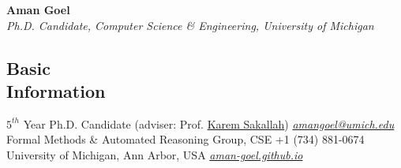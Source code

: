 \documentclass[line,margin,letter]{resume}
\begin{document}
\thispagestyle{empty}
{\sc \LARGE \phantom{xx}\hspace{25ex} \textbf{Aman Goel} 
\vspace{0.3cm}
\\
\large \emph{\phantom{xx}\hspace{11ex} Ph.D. Candidate, Computer Science \& Engineering, University of Michigan}}
\begin{resume}
    

\section{\mysidestyle Basic\\Information}
    $5^{th}$ Year Ph.D. Candidate (adviser: Prof. \href{http://web.eecs.umich.edu/~karem/}{Karem Sakallah})                       \hfill \href{mailto:amangoel@umich.edu}{\textit{amangoel@umich.edu}} \phantom{xx}\hspace{1ex} \faEnvelope \\
    Formal Methods \& Automated Reasoning Group, CSE 
     \hfill +1 (734) 881-0674 \phantom{xx}\hspace{1ex} \faPhone \\
    University of Michigan, Ann Arbor, USA      \hfill \href{https://aman-goel.github.io/}{\textit{aman-goel.github.io}} \phantom{xx}\hspace{1ex} \faExternalLink
    


\end{resume}
\end{document}
